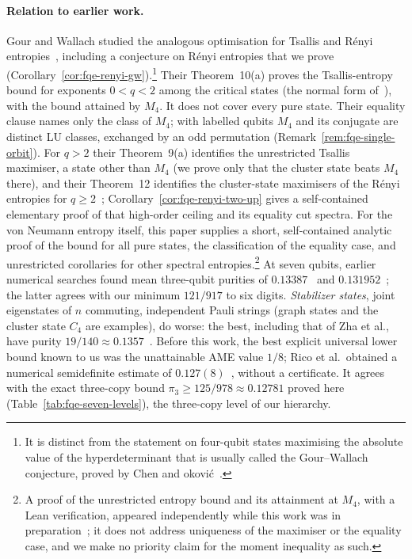 \documentclass[11pt]{article}
\begin{document}
\paragraph{Relation to earlier work.} Gour and Wallach studied the analogous optimisation for Tsallis and R\'enyi
entropies~\cite{GW}, including a conjecture on R\'enyi entropies that we prove (Corollary~\ref{cor:fqe-renyi-gw}).\footnote{It is distinct from the statement on four-qubit states maximising the absolute value of the
hyperdeterminant that is usually called the Gour--Wallach conjecture, proved by Chen and
\DJ{}okovi\'c~\cite{CD}.} Their Theorem~10(a) proves the Tsallis-entropy bound for exponents $0<q<2$
among the critical states (the normal form of~\cite{VDD}), with the
bound attained by $M_4$. It does not cover every pure state. Their equality clause names only the class of $M_4$;
with labelled qubits $M_4$ and its conjugate are distinct LU classes, exchanged by an odd permutation
(Remark~\ref{rem:fqe-single-orbit}). For $q>2$ their Theorem~9(a) identifies the unrestricted Tsallis maximiser, a
state other than $M_4$ (we prove only that the cluster state beats $M_4$ there), and their Theorem~12 identifies the cluster-state maximisers of the
R\'enyi entropies for $q\ge2$~\cite{GW}; Corollary~\ref{cor:fqe-renyi-two-up} gives a self-contained
elementary proof of that high-order ceiling and its equality cut spectra. For the von Neumann entropy itself, this paper supplies
a short, self-contained analytic proof of the bound for all pure states, the classification of the
equality case, and unrestricted corollaries for other spectral entropies.\footnote{A proof of the unrestricted entropy bound and its attainment at $M_4$, with a Lean verification, appeared
independently while this work was in preparation~\cite{Omega}; it does not address uniqueness of the maximiser or the
equality case, and we make no priority claim for the moment inequality as such.}
At seven qubits, earlier numerical searches found mean three-qubit purities of $0.13387$~\cite{Facchi}
and $0.131952$~\cite{DMFF18}; the latter agrees with our minimum $121/917$ to six digits. \emph{Stabilizer states},
joint eigenstates of $n$ commuting, independent Pauli strings (graph states and the cluster state $C_4$ are examples), do worse: the best,
including that of Zha et al., have purity $19/140\approx0.1357$~\cite{Zha11,HGS}.
Before this work, the best explicit universal lower bound known to us was the
unattainable AME value $1/8$; Rico et al.\ obtained a numerical semidefinite
estimate of $0.127(8)$~\cite{Rico}, without a certificate. It agrees with the exact three-copy bound
$\pi_3\ge125/978\approx0.12781$ proved here (Table~\ref{tab:fqe-seven-levels}), the three-copy level of our hierarchy.
\end{document}
